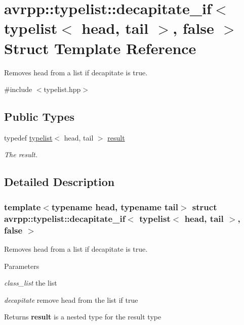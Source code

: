 \hypertarget{structavrpp_1_1typelist_1_1decapitate__if_3_01typelist_3_01head_00_01tail_01_4_00_01false_01_4}{
\section{avrpp::typelist::decapitate\_\-if$<$ typelist$<$ head, tail $>$, false $>$ Struct Template Reference}
\label{structavrpp_1_1typelist_1_1decapitate__if_3_01typelist_3_01head_00_01tail_01_4_00_01false_01_4}
}


Removes head from a list if decapitate is true.  




{\ttfamily \#include $<$typelist.hpp$>$}

\subsection*{Public Types}
\begin{DoxyCompactItemize}
\item 
typedef \hyperlink{structavrpp_1_1typelist_1_1typelist}{typelist}$<$ head, tail $>$ \hyperlink{structavrpp_1_1typelist_1_1decapitate__if_3_01typelist_3_01head_00_01tail_01_4_00_01false_01_4_aadbfa08a69cad1e2e1bbbfbe1b4206fb}{result}
\begin{DoxyCompactList}\small\item\em The result. \item\end{DoxyCompactList}\end{DoxyCompactItemize}


\subsection{Detailed Description}
\subsubsection*{template$<$typename head, typename tail$>$ struct avrpp::typelist::decapitate\_\-if$<$ typelist$<$ head, tail $>$, false $>$}

Removes head from a list if decapitate is true. 
\begin{DoxyParams}{Parameters}
\item[{\em class\_\-list}]the list \item[{\em decapitate}]remove head from the list if true \end{DoxyParams}
\begin{DoxyReturn}{Returns}
{\bfseries result} is a nested type for the result type 
\end{DoxyReturn}


